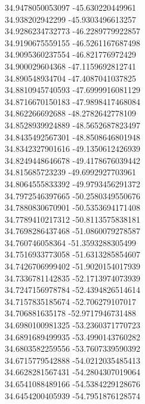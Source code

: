 {34.9478050053097	-45.630220449961\\
34.938202942299	-45.9303496613257\\
34.9286234732773	-46.2289779922857\\
34.9190675559155	-46.5261167687498\\
34.9095360237554	-46.821776972429\\
34.900029604368	-47.1159692812741\\
34.890548934704	-47.4087041037825\\
34.8810945740593	-47.6999916081129\\
34.8716670150183	-47.9898417468084\\
34.862266692688	-48.2782642778109\\
34.8528939924889	-48.5652687823497\\
34.8435492567301	-48.8508646801948\\
34.8342327901616	-49.1350612426939\\
34.8249448646678	-49.4178676039442\\
34.815685723239	-49.6992927703961\\
34.8064555833392	-49.9793456291372\\
34.7972546397665	-50.2580349550676\\
34.7880830670901	-50.5353694171408\\
34.7789410217312	-50.8113575838181\\
34.7698286437468	-51.0860079278587\\
34.760746058364	-51.3593288305499\\
34.7516933773058	-51.6313285854607\\
34.7426706999402	-51.9020154017939\\
34.7336781142835	-52.1713974073939\\
34.7247156978784	-52.4394826514614\\
34.7157835185674	-52.706279107017\\
34.706881635178	-52.9717946731488\\
34.6980100981325	-53.2360371770723\\
34.6891689499935	-53.4990143760282\\
34.6803582259556	-53.7607339590392\\
34.6715779542888	-54.0212035485413\\
34.6628281567431	-54.2804307019064\\
34.6541088489166	-54.5384229128676\\
34.6454200405939	-54.7951876128574\\
}
